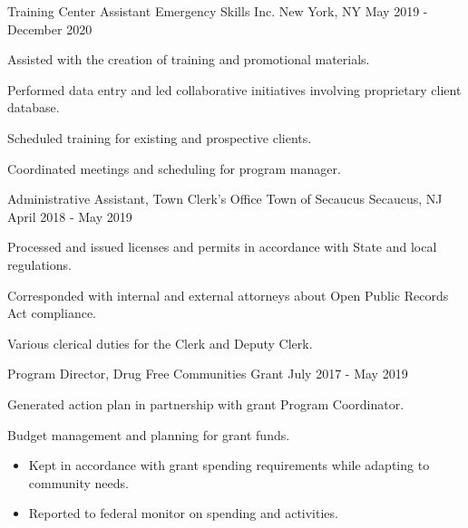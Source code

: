 

\begin{cventries}

  \cventry
    {Training Center Assistant} %
    {Emergency Skills Inc.} %
    {New York, NY} %
    {May 2019 - December 2020} %
    {
      \begin{cvitems} %
        \item {Assisted with the creation of training and promotional materials.}
        \item {Performed data entry and led collaborative initiatives involving proprietary client database.}
        \item {Scheduled training for existing and prospective clients.}
        \item {Coordinated meetings and scheduling for program manager.}
      \end{cvitems}
    }

  \cventry
    {Administrative Assistant, Town Clerk’s Office} %
    {Town of Secaucus} %
    {Secaucus, NJ} %
    {April 2018 - May 2019} %
    {
      \begin{cvitems} %
        \item {Processed and issued licenses and permits in accordance with State and local regulations.}
        \item {Corresponded with internal and external attorneys about Open Public Records Act compliance.}
        \item {Various clerical duties for the Clerk and Deputy Clerk.}
      \end{cvitems}
    }

  \cventry
    {Program Director, Drug Free Communities Grant} %
    {} %
    {} %
    {July 2017 - May 2019} %
    {
      \begin{cvitems} %
        \item {Generated action plan in partnership with grant Program Coordinator.}
        \item {Budget management and planning for grant funds.}
        \begin{itemize}
          \item {Kept in accordance with grant spending requirements while adapting to community needs.}
          \item {Reported to federal monitor on spending and activities.}
        \end{itemize}
      \end{cvitems}
    }


\end{cventries}
